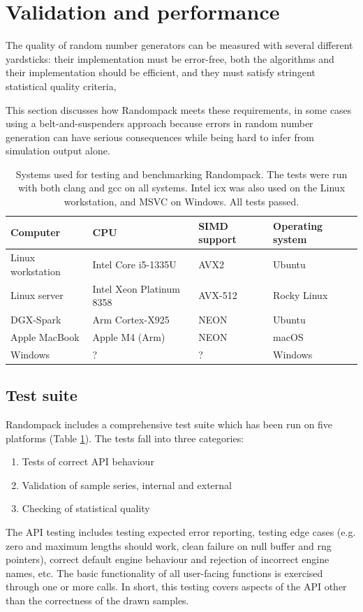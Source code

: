 \documentclass[manuscript,screen,review]{acmart}
\begin{document}
\section{Validation and performance}
The quality of random number generators can be measured with
several different yardsticks: their implementation must be error-free,
both the algorithms and their implementation should be efficient,
and they must satisfy stringent statistical quality criteria,

This section discusses how Randompack meets these requirements, in
some cases using a belt-and-suspenders approach because errors in
random number generation can have serious consequences while being
hard to infer from simulation output alone.

\begin{table}
\caption{Systems used for testing and benchmarking Randompack. The tests were run
with both clang and gcc on all systems. Intel icx was also used on the Linux
workstation, and MSVC on Windows. All tests passed.}
\label{table:platforms}
\centering
\begin{tabular}{llll}
  \toprule
  Computer          & CPU                      & SIMD support & Operating system \\
  \midrule
  Linux workstation & Intel Core i5-1335U      & AVX2         & Ubuntu           \\
  Linux server      & Intel Xeon Platinum 8358 & AVX-512      & Rocky Linux      \\
  DGX-Spark         & Arm Cortex-X925          & NEON         & Ubuntu           \\
  Apple MacBook     & Apple M4 (Arm)           & NEON         & macOS            \\
  Windows           & ?                        & ?            & Windows          \\
  \bottomrule
\end{tabular}
\end{table}

\subsection{Test suite} 
\label{subsec:testing}
Randompack includes a comprehensive test suite which has been run on
five platforms (Table \ref{table:platforms}). The tests fall into three
categories:
%
\begin{enumerate}
\item Tests of correct API behaviour
\item Validation of sample series, internal and external
\item Checking of statistical quality
\end{enumerate}
The API testing includes testing expected error reporting, testing
edge cases (e.g. zero and maximum lengths should work, clean failure
on null buffer and rng pointers), correct default engine behaviour and
rejection of incorrect engine names, etc. The basic functionality of
all user-facing functions is exercised through one or more calls. In
short, this testing covers aspects of the API other than the
correctness of the drawn samples.
\end{document}
